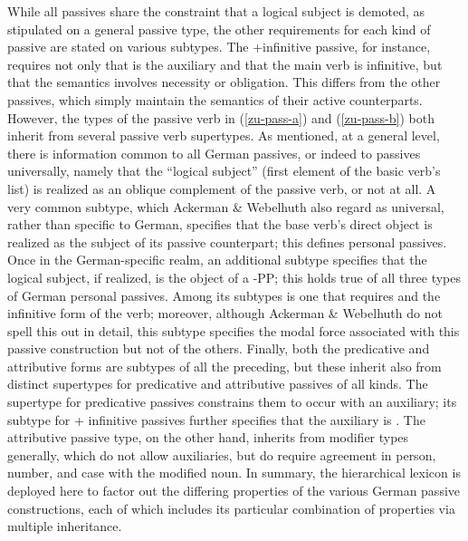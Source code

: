 \documentclass[output=paper]{langsci/langscibook}
\begin{document}
While all passives share the constraint that a logical subject is demoted, as stipulated on a general  passive type, the other requirements for each kind of passive are stated on various subtypes.
The +infinitive passive, for instance, requires not only that  is the auxiliary and that the main verb is infinitive, but that the semantics involves necessity or obligation.
This differs from the other passives, which simply maintain the semantics of their active counterparts.
However, the types of the passive verb  in (\ref{zu-pass-a}) and (\ref{zu-pass-b}) both inherit from several passive verb supertypes.
As mentioned, at a general level, there is information common to all German passives, or indeed to passives universally, namely that the ``logical subject'' (first element of the basic verb's  list) is realized as an oblique complement of the passive verb, or not at all.
A very common subtype, which Ackerman \& Webelhuth also regard as universal, rather than specific to German, specifies that the base verb's direct object is realized as the subject of its passive counterpart; this defines personal passives.
Once in the German-specific realm, an additional subtype specifies that the logical subject, if realized, is the object of a -PP; this holds true of all three types of German personal passives.
Among its subtypes is one that requires  and the infinitive form of the verb; moreover, although Ackerman \& Webelhuth do not spell this out in detail, this subtype specifies the modal force associated with this passive construction but not of the others.
Finally, both the predicative and attributive forms are subtypes of all the preceding, but these inherit also from distinct supertypes for predicative and attributive passives of all kinds.
The supertype for predicative passives constrains them to occur with an auxiliary; its subtype for  + infinitive passives further specifies that the auxiliary is .
The attributive passive type, on the other hand, inherits from modifier types generally, which do not allow auxiliaries, but do require agreement in person, number, and case with the modified noun.
In summary, the hierarchical lexicon is deployed here to factor out the differing properties of the various German passive constructions, each of which includes its particular combination of properties via multiple inheritance.
\end{document}
